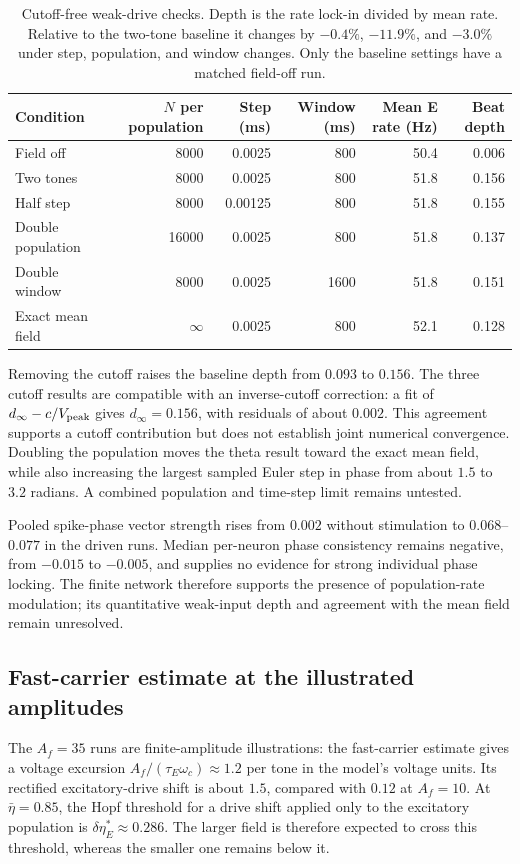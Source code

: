\documentclass[11pt,a4paper]{article}
\begin{document}
\begin{table}[htbp]
\centering\small
\begin{tabular}{@{}lrrrrr@{}}
\toprule
Condition & $N$ per population & Step (ms) & Window (ms) & Mean E rate (Hz) & Beat depth\\
\midrule
Field off & 8000 & 0.0025 & 800 & 50.4 & 0.006\\
Two tones & 8000 & 0.0025 & 800 & 51.8 & 0.156\\
Half step & 8000 & 0.00125 & 800 & 51.8 & 0.155\\
Double population & 16000 & 0.0025 & 800 & 51.8 & 0.137\\
Double window & 8000 & 0.0025 & 1600 & 51.8 & 0.151\\
Exact mean field & $\infty$ & 0.0025 & 800 & 52.1 & 0.128\\
\bottomrule
\end{tabular}
\caption{Cutoff-free weak-drive checks. Depth is the rate lock-in divided by
mean rate. Relative to the two-tone baseline it changes by $-0.4\%$,
$-11.9\%$, and $-3.0\%$ under step, population, and window changes.
Only the baseline settings have a matched field-off run.}
\label{tab:theta-pilot}
\end{table}

Removing the cutoff raises the baseline depth from $0.093$ to $0.156$.
The three cutoff results are compatible with an inverse-cutoff correction:
a fit of $d_\infty-c/V_{\rm peak}$ gives $d_\infty=0.156$, with residuals
of about $0.002$. This agreement supports a cutoff contribution but does not
establish joint numerical convergence. Doubling the population moves the
theta result toward the exact mean field, while also increasing the largest
sampled Euler step in phase from about $1.5$ to $3.2$ radians. A combined
population and time-step limit remains untested.

Pooled spike-phase vector strength rises from $0.002$ without stimulation
to $0.068$--$0.077$ in the driven runs. Median per-neuron phase consistency
remains negative, from $-0.015$ to $-0.005$, and supplies no evidence for
strong individual phase locking. The finite network therefore supports the
presence of population-rate modulation; its quantitative weak-input depth
and agreement with the mean field remain unresolved.

\fi
\subsection{Fast-carrier estimate at the illustrated amplitudes}\label{app:qif-estimate}
The $A_f=35$ runs are finite-amplitude illustrations: the fast-carrier estimate gives a voltage excursion
$A_f/(\tau_E\omega_c)\approx1.2$ per tone in the model's voltage units. Its
rectified excitatory-drive shift is about $1.5$, compared with $0.12$ at
$A_f=10$. At $\bar\eta=0.85$, the Hopf threshold for a drive shift applied
only to the excitatory population is $\delta\eta_E^*\approx0.286$. The larger
field is therefore expected to cross this threshold, whereas the smaller one
remains below it.
\end{document}
